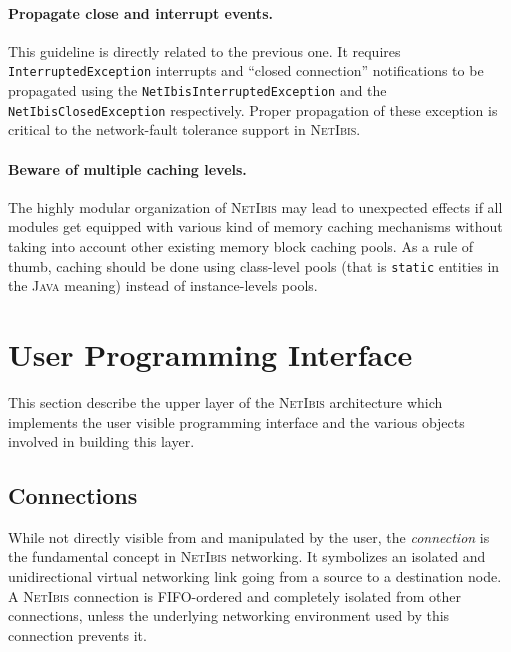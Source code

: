 \documentclass[11pt]{book}
\def\NetIbis{\textsc{NetIbis}\xspace}
\begin{document}

\paragraph{Propagate close and interrupt events.}
\label{sec:prop-close-interr}

This guideline is directly related to the previous one. It requires
\texttt{InterruptedException} interrupts and ``closed connection''
notifications to be propagated using the
\texttt{NetIbisInterruptedException} and the
\texttt{NetIbisClosedException} respectively. Proper propagation of
these exception is critical to the network-fault tolerance support in
\NetIbis.


\paragraph{Beware of multiple caching levels.}
\label{sec:beware-mult-cach}

The highly modular organization of \NetIbis may lead to unexpected
effects if all modules get equipped with various kind of memory
caching mechanisms without taking into account other existing memory
block caching pools. As a rule of thumb, caching should be done using
class-level pools (that is \texttt{static} entities in the
\textsc{Java} meaning) instead of instance-levels pools. 

\section{User Programming Interface}
\label{sec:user-progr-interf}

This section describe the upper layer of the \NetIbis architecture
which implements the user visible programming interface and the
various objects involved in building this layer.

\subsection{Connections}
\label{sec:connections-1}

While not directly visible from and manipulated by the user, the
\emph{connection} is the fundamental concept in \NetIbis networking.
It symbolizes an isolated and unidirectional virtual networking link
going from a source to a destination node. A \NetIbis connection is
FIFO-ordered and completely isolated from other connections, unless
the underlying networking environment used by this connection prevents
it.
\end{document}
